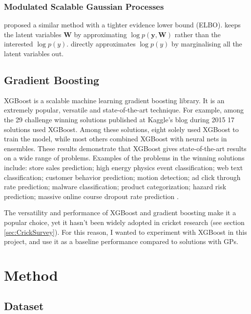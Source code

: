 \documentclass[12pt,a4paper]{report}
\theoremstyle{definition}
\begin{document}
\subsection{Modulated Scalable Gaussian Processes}

\citet{Lui2020} proposed a similar method with a tighter evidence lower bound (ELBO).
\citet{Kaiser2018} keeps the latent variables $\textbf{W}$ by approximating $\log p(\textbf{y}, \textbf{W})$ rather than the interested $\log p(y)$.
\citet{Lui2020} directly approximates $\log p(y)$ by marginalising all the latent variables out.

\section{Gradient Boosting}

XGBoost is a scalable machine learning gradient boosting library.  
It is an extremely popular, versatile and state-of-the-art technique.
For example, among the 29 challenge winning solutions published at Kaggle’s blog during 2015 17 solutions used XGBoost.
Among these solutions, eight solely used XGBoost to train the model, while most others combined XGBoost with neural nets in ensembles.
These results demonstrate that XGBoost gives state-of-the-art results on a wide range of problems. 
Examples of the problems in the winning solutions include: store sales prediction; high energy physics event classification; web text classification; customer behavior prediction; motion detection; ad click through rate prediction; malware classification; product categorization; hazard risk prediction; massive online course dropout rate prediction \citep{Chen2016}.

The versatility and performance of XGBoost and gradient boosting make it a popular choice, yet it hasn't been widely adopted in cricket research (see section \ref{sec:CrickSurvey}).
For this reason, I wanted to experiment with XGBoost in this project, and use it as a baseline performance compared to solutions with GPs.

\chapter{Method}

\section{Dataset} \label{sec:Dataset}
\end{document}
